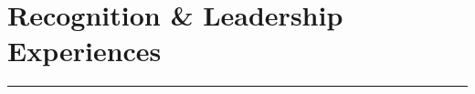 \documentclass[letterpaper,10pt]{article}
\begin{document}

\section*{Recognition \& Leadership Experiences }       

\hrule
\vspace{.3 cm}
\end{document}

